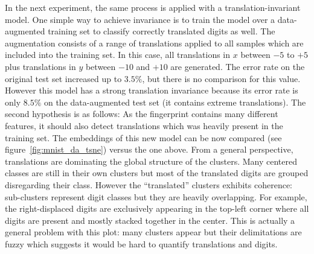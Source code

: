 \documentclass[a4paper,12pt]{report}
\begin{document}
In the next experiment, the same process is applied with a translation-invariant model.
One simple way to achieve invariance is to train the model over a data-augmented training set to classify correctly translated digits as well.
The augmentation consists of a range of translations applied to all samples which are included into the training set.
In this case, all translations in $x$ between $-5$ to $+5$ plus translations in $y$ between $-10$ and $+10$ are generated.
The error rate on the original test set increased up to $3.5\%$, but there is no comparison for this value.
However this model has a strong translation invariance because its error rate is only $8.5\%$ on the data-augmented test set (it contains extreme translations).
The second hypothesis is as follows: As the fingerprint contains many different features, it should also detect translations which was heavily present in the training set.
The embeddings of this new model can be now compared (see figure~\ref{fig:mnist_da_tsne}) versus the one above.
From a general perspective, translations are dominating the global structure of the clusters.
Many centered classes are still in their own clusters but most of the translated digits are grouped disregarding their class.
However the ``translated'' clusters exhibits coherence: sub-clusters represent digit classes but they are heavily overlapping.
For example, the right-displaced digits are exclusively appearing in the top-left corner where all digits are present and mostly stacked together in the center.
This is actually a general problem with this plot: many clusters appear but their delimitations are fuzzy which suggests it would be hard to quantify translations and digits.
\end{document}
